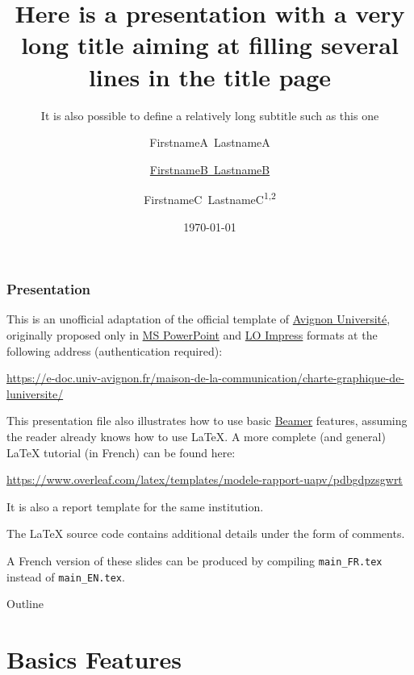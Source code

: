 \documentclass[10pt,    %
    english,            %
    xcolor=table,       %
    envcountsect,       %
    aspectratio=43      %
]{beamer}
\title[Short Title] %
    {Here is a presentation with a very long title aiming at filling several lines in the title page}
\subtitle{It is also possible to define a relatively long subtitle such as this one} %
\date[Short date] %
    {\today}
\author[Short author] %
{FirstnameA~LastnameA\inst{1} \and \underline{FirstnameB~LastnameB}\inst{2} \and FirstnameC~LastnameC\textsuperscript{1,2}}
\institute[] %
{\inst{1} Computer Science Lab, Avignon University -- LIA EA 4128 \texttt{\{firstname.lastname\}@univ-avignon.fr}
\and \inst{2} Institute of Disruptive Innovation, University of Excellence \texttt{\{firstname.lastname\}@univ-excell.fr}
}
\begin{document}
\begin{frame}
  \titlepage
\end{frame}

\begin{frame}
    \label{frm:first}
    \frametitle{Presentation} 
    
    This is an unofficial adaptation of the official template of \href{http://univ-avignon.fr/}{Avignon Université}, originally proposed only in \href{https://en.wikipedia.org/wiki/Microsoft\_PowerPoint}{MS PowerPoint} and \href{https://en.wikipedia.org/wiki/LibreOffice\#Included\_applications}{LO Impress} formats at the following address (authentication required):
    
    \url{https://e-doc.univ-avignon.fr/maison-de-la-communication/charte-graphique-de-luniversite/}
    
    \medskip
    This presentation file also illustrates how to use basic \href{https://en.wikipedia.org/wiki/Beamer_(LaTeX)}{Beamer} features, assuming the reader already knows how to use \LaTeX{}. A more complete (and general) \LaTeX{} tutorial (in French) can be found here: 
    
    \url{https://www.overleaf.com/latex/templates/modele-rapport-uapv/pdbgdpzsgwrt}
    
    It is also a report template for the same institution.
    
    \medskip
    The \LaTeX{} source code contains additional details under the form of comments.
    
    \medskip
    A French version of these slides can be produced by compiling \texttt{main\_FR.tex} instead of \texttt{main\_EN.tex}.
\end{frame}

\begin{frame}{Outline}
    \tableofcontents
\end{frame}












\section{Basics Features}
\label{sec:basics}
\sectionframe
\end{document}

